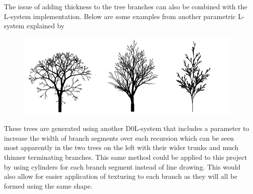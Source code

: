 \documentclass[progress]{cmpreport}
\begin{document}
The issue of adding thickness to the tree branches can also be combined with the L-system 
implementation. Below are some examples from another parametric L-system explained by 
\cite{prusinkiewicz1996systems} 

\begin{figure}[h]
        \includegraphics[scale=0.7]{tree_examples}
        \centering
\end{figure}

These trees are generated using another D0L-system that includes a parameter to increase the 
width of branch segments over each recursion which can be seen most apparently in the two 
trees on the left with their wider trunks and much thinner terminating branches. This same 
method could be applied to this project by using cylinders for each branch segment instead of 
line drawing. This would also allow for easier application of texturing to each branch as they 
will all be formed using the same shape.

\clearpage

\end{document}
